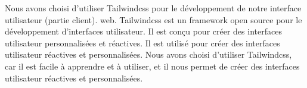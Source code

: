 Nous avons choisi d'utiliser Tailwindcss pour le développement de notre interface utilisateur (partie client).
web. Tailwindcss est un framework open source pour le développement
d'interfaces utilisateur. Il est conçu pour créer des interfaces utilisateur
personnalisées et réactives. Il est utilisé pour créer des interfaces
utilisateur réactives et personnalisées. Nous avons choisi d'utiliser
Tailwindcss, car il est facile à apprendre et à utiliser, et il nous permet de
créer des interfaces utilisateur réactives et personnalisées.